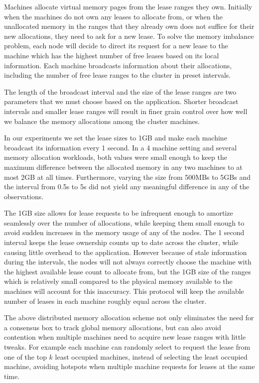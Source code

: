 Machines allocate virtual memory pages from the lease ranges they own. Initially
when
the machines do not own any leases to allocate from, or when the unallocated
memory in the
ranges that they already own does not suffice for their new allocations, they
need to ask for a new lease. To solve the memory imbalance problem, each node
will decide to direct its request for a new lease to the machine which
has the highest number of free leases based on its local information.
Each machine broadcasts information about their allocations, including
the number of free lease ranges to the cluster in preset intervals.

The length of the broadcast interval and the size of the lease ranges are two
parameters that we must choose based on the application. Shorter broadcast
intervals and smaller lease ranges will result in finer grain control over
how well we balance the memory allocations among the cluster machines.

In our experiments we set the lease sizes to 1GB and
make each machine broadcast its information every 1 second. In a 4 machine
setting and several memory allocation workloads, both values were small enough
to keep the maximum difference between the
allocated memory in any two machines to at most 2GB at all times.
Furthermore, varying the size from
500MBs to 5GBs and the interval from 0.5s to 5s did not yield any meaningful
difference in any of the observations.


The 1GB size allows for lease requests to be infrequent enough to amortize
seamlessly over the number of allocations, while keeping them small enough
to avoid sudden increases in the memory usage of any of the nodes. The 1
second interval keeps the lease ownership counts up to date across the cluster,
while causing little overhead to the application. However because of stale
information during the intervals, the nodes will not always
correctly choose the machine with the highest available lease count to allocate
from, but the 1GB size of the ranges which is relatively small compared to the
physical memory available to the machines will account for this inaccuracy.
This protocol
will keep the available number of leases in each machine roughly equal across
the cluster.

The above distributed memory allocation scheme not only eliminates the need for
a consensus box to track global memory allocations, but can also avoid
contention when multiple machines need to acquire new lease ranges with
little tweaks. For example each machine can randomly select to request the
lease from one of the top $k$ least occupied machines, instead of selecting
the least occupied machine, avoiding hotspots when multiple machine requests
for leases at the same time.

